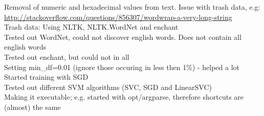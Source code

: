 Removal of numeric and hexadecimal values from text. Issue with trash data, e.g: \\
\url{http://stackoverflow.com/questions/856307/wordwrap-a-very-long-string} \\
 Trash data: Using NLTK, NLTK.WordNet and enchant \\
 Tested out WordNet, could not discover english words. Does not contain all english words \\
 Tested out enchant, but could not in all  \\
 Setting min\_df=0.01 (ignore those occuring in less then 1\%) - helped a lot \\
 Started training with SGD \\
 Tested out different SVM algorithms (SVC, SGD and LinearSVC) \\
 Making it executable; e.g. started with opt/argparse, therefore shortcuts are (almost) the same

